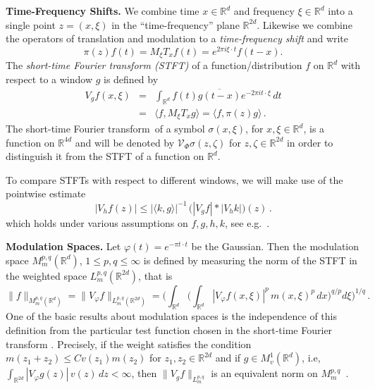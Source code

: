 \documentclass[12pt]{amsart}
\theoremstyle{definition}
\theoremstyle{remark}
\numberwithin{equation}{section}
\newcommand{\stft}{short-time Fourier transform}
\newcommand{\tf}{time-frequency}
\newcommand{\tfs}{time-frequency shift}
\newcommand{\modsp}{modulation space}
\def\bR{{\mathbb{R}}}
\def\vgf{V_gf}
\def\rd{\bR^d}
\def\rdd{{\bR^{2d}}}
\def\intrd{\int_{\rd}}
\def\intrdd{\int_{\rdd}}
\def\inv{^{-1}}
\def\ud{\, d}
\def\Mmpq{M_m^{p,q}}
\def\cV{\mathcal{V}}
\newcommand{\fourd}{\bR ^{4d}}
\newcommand{\phase}{(x,\xi)}
\begin{document}
\textbf{Time-Frequency Shifts. } We combine time $x\in \rd $ and
frequency $\xi\in \rd $ into a single point $z= (x,\xi ) $ in the
``\tf '' plane $\rdd $. Likewise we combine the operators of
translation and modulation to a \emph{\tfs } and write $$ \pi (z )
f(t) = M_\xi T_x f(t) = e^{2\pi i \xi \cdot t}   f(t-x). $$ The
\emph{short-time Fourier transform (STFT)} of a
function/distribution
  $f$ on $\rd $  with   respect to a window $g$ is defined by
  \begin{eqnarray*}
\vgf (x,\xi) & = & \intrd f(t) \overline{g(t-x)} e^{-2\pi i t\cdot
\xi} \, dt \\ &=&  \langle f, M_\xi T_x g\rangle = \langle f, \pi
(z) g\rangle \, .
  \end{eqnarray*}
The \stft\ of a symbol $\sigma \phase$, for $x,\xi \in \rd$, is a
function on $\fourd $ and will be denoted by $\cV _\Phi \sigma
(z,\zeta )$ for $z,\zeta \in \rdd $ in order to distinguish it
from the STFT of a function on $\rd $.

To compare STFTs with respect to different windows, we will make use of the
pointwise estimate
\begin{equation}
  \label{eq:fi7}
  |V_hf (z)| \leq |\langle k,g\rangle |\inv \, \big( |V_gf|
  \ast |V_hk|\big) (z) \, .
\end{equation}
which holds under various assumptions on $f,g,h,k$, see
e.g.~\cite[Lemma~11.3.3]{book}. 

\textbf{Modulation Spaces.} Let $\varphi (t) = e^{-\pi t\cdot t}$ be
the Gaussian. Then the  modulation space $M^{p,q}_m(\rd)$, $1\leq
p,q\leq \infty $ is 
defined by measuring the norm of the STFT in the weighted space
$L^{p,q}_m(\rdd)$, that is
\[
\|f\|_{M^{p,q}_m(\rd)}=\|V_{\varphi} f\|_{L^{p,q}_m(\rdd)}  =
\biggl( \intrd \biggl(
    \intrd |V_{\varphi} f(x,\xi)|^p\,
m(x,\xi)^p \ud x\biggr)^{q/p} d\xi \biggr)^{1/q} \, .
\]
One of the basic results about \modsp s is the independence of this
definition from the particular test function chosen in the \stft
. Precisely, if the weight satisfies the condition $m(z_1+z_2) \leq C
v(z_1) m(z_2)$ for $z_1,z_2\in \rdd $ and if $g\in M^1_v(\rd )$, i.e,
$\intrdd |V_\varphi g(z)| \, v(z) \, dz <\infty$, then $\|V_gf
\|_{L^{p,q}_m} $ is an equivalent norm on $\Mmpq $~\cite[Thm.~11.3.7]{book}. 
\end{document}
